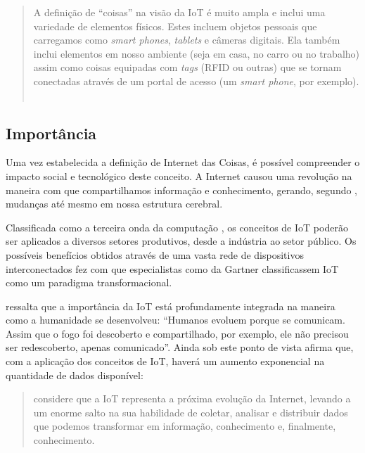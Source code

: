 \documentclass[twoside,english,brazilian]{UNISINOSmonografia}
\begin{document}
		\begin{quote}
			A definição de ``coisas'' na visão da IoT é muito ampla e inclui 
			uma variedade de elementos físicos. Estes incluem objetos pessoais 
			que carregamos como \textit{smart phones}, \textit{tablets} e 
			câmeras digitais. Ela também inclui elementos em nosso ambiente 
			(seja em casa, no carro ou no trabalho) assim como coisas 
			equipadas com \textit{tags} (RFID ou outras) que se tornam 
			conectadas através de um portal de acesso (um \textit{smart 
			phone}, por exemplo).
			~\cite{Coetzee2011}
		\end{quote}
		

\subsection{Importância}

		Uma vez estabelecida a definição de Internet das Coisas, é possível 
		compreender o impacto social e tecnológico deste conceito. A Internet 
		causou uma revolução na maneira com que compartilhamos informação e 
		conhecimento, gerando, segundo , mudanças até 
		mesmo em nossa estrutura cerebral.
		
		Classificada como a terceira onda da computação \cite{Register2013}, 
		os conceitos de IoT poderão ser aplicados a diversos setores 
		produtivos, desde a indústria ao setor público. Os possíveis 
		benefícios obtidos através de uma vasta rede de dispositivos 
		interconectados fez com que especialistas como  da 
		Gartner classificassem IoT como um paradigma transformacional.
		
		 ressalta que a importância da IoT está 
		profundamente integrada na maneira como a humanidade se desenvolveu: 
		``Humanos evoluem porque se comunicam. Assim que o fogo foi descoberto 
		e compartilhado, por exemplo, ele não precisou ser redescoberto, 
		apenas comunicado''. Ainda sob este ponto de vista afirma que, com a 
		aplicação dos conceitos de IoT, haverá um aumento exponencial na 
		quantidade de dados disponível:
		
		\begin{quote}
			considere que a IoT representa a próxima evolução da Internet, 
			levando a um enorme salto na sua habilidade de coletar, analisar e 
			distribuir dados que podemos transformar em informação, 
			conhecimento e, finalmente, conhecimento.~\cite{Cisco2011}
		\end{quote}
		
\end{document}
